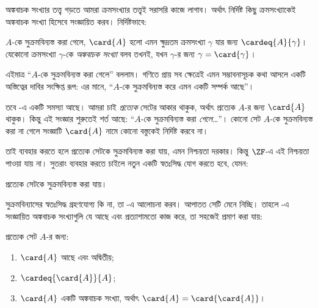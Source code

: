 \documentclass[../../../include/open-logic-section]{subfiles}
\begin{document}

অঙ্কবাচক সংখ্যার তত্ত্ব গড়তে আমরা ক্রমসংখ্যার তত্ত্বই
সরাসরি কাজে লাগাব। অর্থাৎ নির্দিষ্ট কিছু ক্রমসংখ্যাকেই
অঙ্কবাচক সংখ্যা হিসেবে সংজ্ঞায়িত করব। নির্দিষ্টভাবে:

\begin{defn}
$A$-কে সুক্রমবিন্যস্ত করা গেলে, $\card{A}$ হলো এমন ক্ষুদ্রতম
ক্রমসংখ্যা $\gamma$ যার জন্য $\cardeq{A}{\gamma}$। যেকোনো
ক্রমসংখ্যা $\gamma$-কে \emph{অঙ্কবাচক সংখ্যা} বলব তখনই, যখন
$\gamma$-র জন্য
$\gamma = \card{\gamma}$।
\end{defn}

এইমাত্র ``$A$-কে সুক্রমবিন্যস্ত করা গেলে'' বললাম। গণিতে
প্রায় সব ক্ষেত্রেই এমন সম্ভাবনাসূচক কথা আসলে একটি অস্তিত্বের
দাবির সংক্ষিপ্ত রূপ: এর মানে, ``$A$-কে সুক্রমবিন্যস্ত করে
এমন একটি সম্পর্ক আছে''।

তবে -এ একটি সমস্যা আছে। আমরা চাই
\emph{প্রত্যেক} সেটের আকার থাকুক, অর্থাৎ প্রত্যেক $A$-র জন্য
$\card{A}$ থাকুক। কিন্তু এই সংজ্ঞার শুরুতেই শর্ত আছে:
``$A$-কে সুক্রমবিন্যস্ত করা \emph{গেলে}\ldots''। কোনো
সেট $A$-কে সুক্রমবিন্যস্ত করা না গেলে সংজ্ঞাটি
$\card{A}$ নামে কোনো বস্তুকেই নির্দিষ্ট করবে না।

তাই  ব্যবহার করতে হলে প্রত্যেক
সেটকে সুক্রমবিন্যস্ত করা যায়, এমন নিশ্চয়তা দরকার। কিন্তু
$\ZF$-এ এই নিশ্চয়তা পাওয়া যায় না। সুতরাং 
ব্যবহার করতে চাইলে নতুন একটি স্বতঃসিদ্ধ যোগ করতে হবে, যেমন:
\begin{axiom}[সুক্রমবিন্যাস]
প্রত্যেক সেটকে সুক্রমবিন্যস্ত করা যায়।
\end{axiom}
সুক্রমবিন্যাসের স্বতঃসিদ্ধ গ্রহণযোগ্য কি না, তা
-এ আলোচনা করব। আপাতত সেটি মেনে নিচ্ছি।
তাহলে -এ সংজ্ঞায়িত অঙ্কবাচক
সংখ্যাগুলি যে আছে এবং প্রত্যাশামতো কাজ করে, তা সহজেই প্রমাণ করা যায়:

\begin{lem}
প্রত্যেক সেট $A$-র জন্য:
\begin{enumerate}
	\item{} $\card{A}$ আছে এবং অদ্বিতীয়;
	\item{} $\cardeq{\card{A}}{A}$;
	\item{} $\card{A}$ একটি অঙ্কবাচক সংখ্যা,
	অর্থাৎ $\card{A} = \card{\card{A}}$।
\end{enumerate}
\end{lem}
\end{document}
